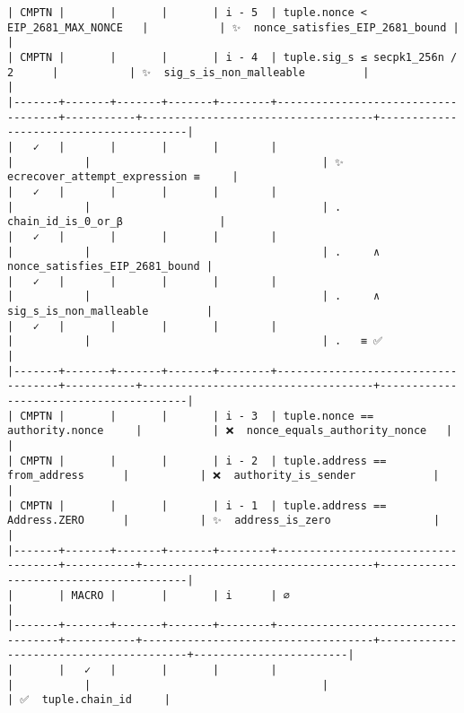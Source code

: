 \documentclass[varwidth=\maxdimen,margin=0.5cm,multi={verbatim}]{standalone}
\begin{document}
\begin{verbatim}
| CMPTN |       |       |       | i - 5  | tuple.nonce < EIP_2681_MAX_NONCE   |           | ✨  nonce_satisfies_EIP_2681_bound |                                        |
| CMPTN |       |       |       | i - 4  | tuple.sig_s ≤ secpk1_256n / 2      |           | ✨  sig_s_is_non_malleable         |                                        |
|-------+-------+-------+-------+--------+------------------------------------+-----------+------------------------------------+----------------------------------------|
|   ✓   |       |       |       |        |                                    |           |                                    | ✨  ecrecover_attempt_expression ≡     |
|   ✓   |       |       |       |        |                                    |           |                                    | .     chain_id_is_0_or_β               |
|   ✓   |       |       |       |        |                                    |           |                                    | .     ∧ nonce_satisfies_EIP_2681_bound |
|   ✓   |       |       |       |        |                                    |           |                                    | .     ∧ sig_s_is_non_malleable         |
|   ✓   |       |       |       |        |                                    |           |                                    | .   ≡ ✅                               |
|-------+-------+-------+-------+--------+------------------------------------+-----------+------------------------------------+----------------------------------------|
| CMPTN |       |       |       | i - 3  | tuple.nonce == authority.nonce     |           | ❌  nonce_equals_authority_nonce   |                                        |
| CMPTN |       |       |       | i - 2  | tuple.address == from_address      |           | ❌  authority_is_sender            |                                        |
| CMPTN |       |       |       | i - 1  | tuple.address == Address.ZERO      |           | ✨  address_is_zero                |                                        |
|-------+-------+-------+-------+--------+------------------------------------+-----------+------------------------------------+----------------------------------------|
|       | MACRO |       |       | i      | ∅                                  |
|-------+-------+-------+-------+--------+------------------------------------+-----------+------------------------------------+----------------------------------------+------------------------|
|       |   ✓   |       |       |        |                                    |           |                                    |                                        | ✅  tuple.chain_id     |

\end{verbatim}
\end{document}
